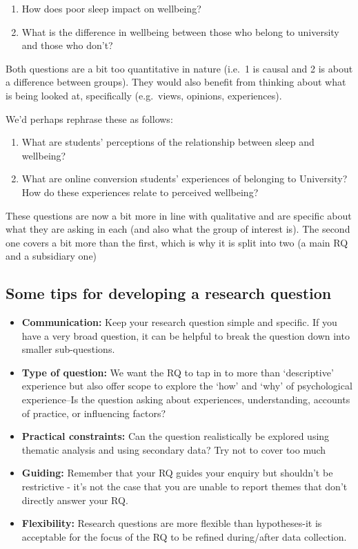 \documentclass[
  english,
  letterpaper,
  DIV=11,
  numbers=noendperiod]{scrreprt}
\providecommand{\tightlist}{%
  \setlength{\itemsep}{0pt}\setlength{\parskip}{0pt}}
\begin{document}
\begin{enumerate}
\def\labelenumi{\arabic{enumi}.}
\tightlist
\item
  How does poor sleep impact on wellbeing?
\item
  What is the difference in wellbeing between those who belong to
  university and those who don't?
\end{enumerate}

Both questions are a bit too quantitative in nature (i.e.~1 is causal
and 2 is about a difference between groups). They would also benefit
from thinking about what is being looked at, specifically (e.g.~views,
opinions, experiences).

We'd perhaps rephrase these as follows:

\begin{enumerate}
\def\labelenumi{\arabic{enumi}.}
\tightlist
\item
  What are students' perceptions of the relationship between sleep and
  wellbeing?
\item
  What are online conversion students' experiences of belonging to
  University? How do these experiences relate to perceived wellbeing?
\end{enumerate}

These questions are now a bit more in line with qualitative and are
specific about what they are asking in each (and also what the group of
interest is). The second one covers a bit more than the first, which is
why it is split into two (a main RQ and a subsidiary one)

\subsection{Some tips for developing a research
question}\label{some-tips-for-developing-a-research-question}

\begin{itemize}
\tightlist
\item
  \textbf{Communication:} Keep your research question simple and
  specific. If you have a very broad question, it can be helpful to
  break the question down into smaller sub-questions.
\item
  \textbf{Type of question:} We want the RQ to tap in to more than
  `descriptive' experience but also offer scope to explore the `how' and
  `why' of psychological experience--Is the question asking about
  experiences, understanding, accounts of practice, or influencing
  factors?\\
\item
  \textbf{Practical constraints:} Can the question realistically be
  explored using thematic analysis and using secondary data? Try not to
  cover too much
\item
  \textbf{Guiding:} Remember that your RQ guides your enquiry but
  shouldn't be restrictive - it's not the case that you are unable to
  report themes that don't directly answer your RQ.
\item
  \textbf{Flexibility:} Research questions are more flexible than
  hypotheses-it is acceptable for the focus of the RQ to be refined
  during/after data collection.
\end{itemize}
\end{document}
